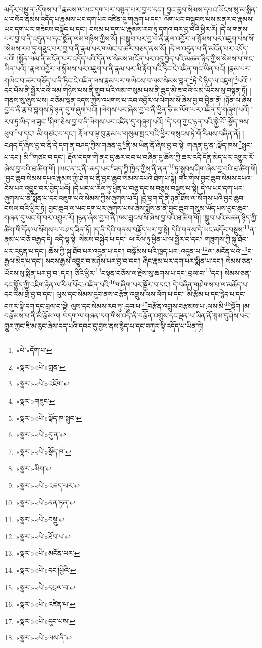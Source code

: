 མདོར་བསྡུ་ན་:དོགས་པ་\footnote{«པེ་»དོག་པ་}རྣམས་ལ་ཡང་དག་པར་བསྟན་པར་བྱ་བ་དང་། བྱང་ཆུབ་སེམས་དཔའ་ཡོངས་སུ་མ་སྨིན་པ་བསོད་ནམས་འདོད་པ་རྣམས་ཡང་དག་པར་འཛིན་དུ་གཞུག་པ་དང་། ལོག་པར་བསྒྲུབས་པས་མནར་བ་རྣམས་ཡང་དག་པར་གཟེངས་བསྟོད་པ་དང་། བསམ་པ་དག་པ་རྣམས་རབ་ཏུ་དགའ་བར་བྱ་བའི་ཕྱིར་རོ། །དེ་ལ་གནས་པར་བྱ་བ་ནི་འདུན་པ་དང་སྨོན་ལམ་གཉིས་ཀྱིས་སོ། །བསྒྲུབ་པར་བྱ་བ་ནི་རྣལ་འབྱོར་ལ་སྙོམས་པར་འཇུག་པས་སོ། །སེམས་རབ་ཏུ་གཟུང་བར་བྱ་བ་ནི་རྣམ་པར་གཡེང་བ་ཚར་བཅད་ནས་སོ། །དེ་ལ་འདུན་པ་ནི་མངོན་པར་འདོད་པའོ། །སྨོན་ལམ་ནི་མངོན་པར་འདོད་པའི་དོན་ལ་སེམས་མངོན་པར་འདུ་བྱེད་པའི་མཚན་ཉིད་ཀྱིས་སེམས་པ་གང་ཡིན་པའོ། །རྣལ་འབྱོར་ལ་སྙོམས་པར་འཇུག་པ་ནི་རྣམ་པར་མི་རྟོག་པའི་ཏིང་ངེ་འཛིན་གང་ཡིན་པའོ། །རྣམ་པར་གཡེང་བ་ཚར་གཅོད་པ་ནི་ཏིང་ངེ་འཛིན་ལས་རྣམ་པར་གཡེངས་བ་ལས་སེམས་བླན་\footnote{«སྣར་»«པེ་»གླན་}ཏེ་དེ་ཉིད་ལ་འཇུག་\footnote{«སྣར་»«པེ་»འཇོག་}པའོ། །དང་པོས་ནི་སྦྱོར་བའི་ལམ་གཉིས་པས་ནི་གྲུབ་པའི་ལམ་གསུམ་པས་ནི་ཆུད་མི་ཟ་བའི་ལམ་ཡོངས་སུ་བསྟན་ཏོ། །གནས་སུ་ཞུས་པས། བཅོམ་ལྡན་འདས་ཀྱིས་འཕགས་པ་རབ་འབྱོར་ལ་ལེགས་སོ་ཞེས་བྱ་བ་བྱིན་ནོ། །ཉོན་ལ་ཞེས་བྱ་བ་ནི་རྣ་བ་བླགས་ཏེ་ཉན་དུ་གཞུག་པའོ། །ལེགས་པར་ཞེས་བྱ་བ་ནི་ཕྱིན་ཅི་མ་ལོག་པར་འཛིན་དུ་གཞུག་པའོ། །རབ་ཏུ་ཡིད་ལ་ཟུང་\footnote{«སྣར་»གཟུང་}ཤིག་ཅེས་བྱ་བ་ནི་ལེགས་པར་འཛིན་དུ་གཞུག་པའོ། །དེ་དག་ཀྱང་ཉན་པའི་སྐྱེ་བོ་:སྣོད་ཁས་ཕུབ་\footnote{«སྣར་»«པེ་»སྣོད་ཁ་སྦུབ་}པ་དང་། མི་གཙང་བ་དང་། རྡོལ་བ་ལྟ་བུ་རྣམ་པ་གསུམ་སྤང་བའི་ཕྱིར་གསུངས་ཏེ་གོ་རིམས་བཞིན་ནོ། །བཤད་དོ་ཞེས་བྱ་བ་ནི་དེ་དག་ན་བཤད་ཀྱིས་གཞན་དུ་\footnote{«སྣར་»«པེ་»དུ་ན་}ནི་མ་ཡིན་ནོ་ཞེས་བྱ་བ་སྟེ། གཞན་དུ་ན་:སྣོད་ཁས་\footnote{«སྣར་»«པེ་»སྣོད་ཁ་}སྦུབ་པ་དང་། མི་\footnote{«སྣར་»མིག་}གཙང་བ་དང་། རྡོལ་བདག་གི་ནང་དུ་ཆར་བབ་པ་བཞིན་དུ་ཆོས་ཀྱི་ཆར་འདི་དོན་མེད་པར་འགྱུར་རོ་ཞེས་བྱ་བའི་ཐ་ཚིག་གོ། །ཡང་ན་ང་ནི་:ཆད་པར་\footnote{«སྣར་»«པེ་»འཆད་པར་}ཟད་ཀྱི་ཁྱེད་ཀྱིས་ནི་ནན་\footnote{«སྣར་»«པེ་»ནན་ཏན་}ཏུ་སྒྲུབས་ཤིག་ཞེས་བྱ་བའི་ཐ་ཚིག་གོ། །བྱང་ཆུབ་སེམས་དཔའ་རྣམས་ཀྱི་ཐེག་པ་ནི་བྱང་ཆུབ་སེམས་དཔའི་ཐེག་པ་སྟེ། གང་གིས་བྱང་ཆུབ་སེམས་དཔའ་ངེས་པར་འབྱུང་བར་བྱེད་པའོ། །དེ་ཡང་ཕ་རོལ་ཏུ་ཕྱིན་པ་བཅུ་དང་ས་བཅུས་བསྡུས་པ་སྟེ། དེ་ལ་ཡང་དག་པར་ཞུགས་པ་ནི་སྨོན་པ་དང་འཇུག་པའི་སེམས་ཀྱིས་ཞུགས་པའོ། །བྱེ་བྲག་དེ་ནི་ཉན་ཐོས་ལ་སོགས་པའི་བྱང་ཆུབ་བསལ་བའི་ཕྱིར་ཏེ། བྱང་ཆུབ་ལ་ཡང་དག་པར་ཞུགས་པས་ཞེས་སྨོས་ན་ནི་བྱང་ཆུབ་གསུམ་ཡོད་པས་བྱང་ཆུབ་གཞན་དུ་ཡང་གོ་བར་འགྱུར་རོ། །ཉན་ཞེས་བྱ་བ་ནི་ཁས་བླངས་སོ་ཞེས་བྱ་བའི་ཐ་ཚིག་གོ། །སྒྲུབ་པའི་མཚན་ཉིད་ཀྱི་ཚིག་གི་དོན་ལ་སོགས་པ་བཤད་ཟིན་ཏོ། །ད་ནི་དེའི་གནས་བརྗོད་པར་བྱ་སྟེ། དེའི་གནས་དེ་ཡང་མདོར་བསྡུས་\footnote{«སྣར་»«པེ་»བསྡུ་}ན་རྣམ་པ་བཅོ་བརྒྱད་དེ། འདི་ལྟ་སྟེ། སེམས་བསྐྱེད་པ་དང་། ཕ་རོལ་ཏུ་ཕྱིན་པ་ལ་སྦྱོར་བ་དང་། གཟུགས་ཀྱི་སྐུ་ཐོབ་པར་འདུན་པ་དང་། ཆོས་ཀྱི་སྐུ་ཐོབ་པར་འདུན་པ་དང་། བསྒོམས་པའི་ཁྱད་པར་:འདུན་པ་\footnote{«སྣར་»«པེ་»ཐོབ་པ་}ལ་:མངོན་པའི་\footnote{«སྣར་»«པེ་»མངོན་པར་}ང་རྒྱལ་མེད་པ་དང་། སངས་རྒྱས་འབྱུང་བ་མཉེས་པར་བྱ་བ་དང་། ཞིང་རྣམ་པར་དག་པར་སྨིན་པ་དང་། སེམས་ཅན་ཡོངས་སུ་སྨིན་པར་བྱ་བ་:དང་། ཅིའི་ཕྱིར་\footnote{«སྣར་»«པེ་»དང་།ཕྱིའི་}བསྟན་བཅོས་ལ་རྗེས་སུ་ཆགས་པ་དང་:བྲལ་བ་\footnote{«སྣར་»«པེ་»དཔྲལ་བ་}དང་། སེམས་ཅན་དང་སྣོད་ཀྱི་འཇིག་རྟེན་ལ་རིལ་པོར་:འཛིན་པའི་\footnote{«སྣར་»«པེ་»འཛིན་པ་}གཞིག་པར་སྦྱོར་བ་དང་། དེ་བཞིན་གཤེགས་པ་ལ་མཆོད་པ་དང་རིམ་གྲོ་བྱ་བ་དང་། ལུས་དང་སེམས་དུབ་ནས་བརྩོན་འགྲུས་ལས་ལོག་པ་དང་། མི་རྩོམ་པ་དང་རྙེད་པ་དང་བཀུར་སྟི་དག་དང་བྲལ་བ་སྟེ། ལུས་དང་སེམས་རབ་ཏུ་:དུབ་པ་\footnote{«སྣར་»«པེ་»དུབ་པས་}བརྩོན་འགྲུས་བརྩམས་པ་:ལས་མི་\footnote{«སྣར་»«པེ་»ལས་ནི་}ལྡོག །མ་བརྩམས་པ་ནི་མི་རྩོམ་ལ། བདག་ལ་གཞན་དག་གིས་འདི་ནི་བརྩོན་འགྲུས་དང་ལྡན་པ་ཡིན་ནོ་སྙམ་དུ་ཤེས་པར་གྱུར་ཀྱང་ཇི་མ་རུང་ཞེས་དད་པའི་དབང་དུ་བྱས་ནས་རྙེད་པ་དང་བཀུར་སྟི་འདོད་པ་ཡིན་ཏེ། 